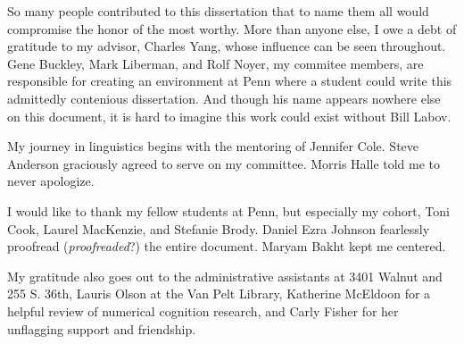 So many people contributed to this dissertation that to name them all would compromise the honor of the most worthy. 
More than anyone else, I owe a debt of gratitude to my advisor, Charles Yang, whose influence can be seen throughout. 
Gene Buckley, Mark Liberman, and Rolf Noyer, my commitee members, are responsible for creating an environment at Penn where a student could write this admittedly contenious dissertation. 
And though his name appears nowhere else on this document, it is hard to imagine this work could exist without Bill Labov.

My journey in linguistics begins with the mentoring of Jennifer Cole. 
Steve Anderson graciously agreed to serve on my committee. 
Morris Halle told me to never apologize.

I would like to thank my fellow students at Penn, but especially my cohort, Toni Cook, Laurel MacKenzie, and Stefanie Brody. 
Daniel Ezra Johnson fearlessly proofread (\emph{proofreaded}?) the entire document. 
Maryam Bakht kept me centered.

My gratitude also goes out to the administrative assistants at 3401 Walnut and 255 S. 36th, Lauris Olson at the Van Pelt Library, Katherine McEldoon for a helpful review of numerical cognition research, and Carly Fisher for her unflagging support and friendship.
